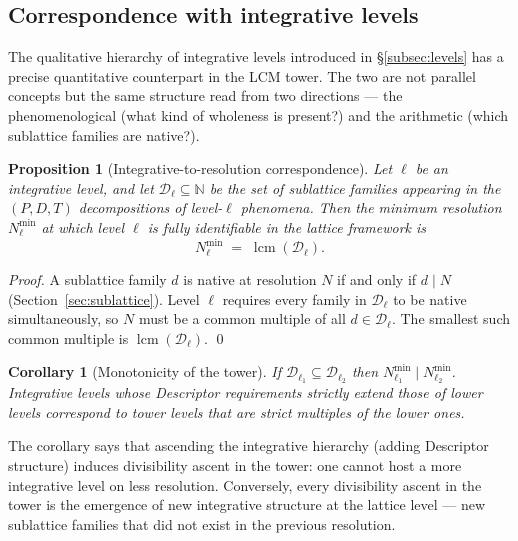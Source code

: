 \documentclass[11pt,a4paper]{article}
\newtheorem{corollary}[theorem]{Corollary}
\newtheorem{proposition}[theorem]{Proposition}
\theoremstyle{definition}
\theoremstyle{remark}
\newcommand{\N}{\mathbb{N}}
\DeclareMathOperator{\lcm}{lcm}
\begin{document}
\subsection{Correspondence with integrative levels}\label{subsec:levels-tower}

The qualitative hierarchy of integrative levels introduced in \S\ref{subsec:levels} has a precise quantitative counterpart in the LCM tower. The two are not parallel concepts but the same structure read from two directions --- the phenomenological (what kind of wholeness is present?) and the arithmetic (which sublattice families are native?).

\begin{proposition}[Integrative-to-resolution correspondence]\label{prop:int-resolution}
Let $\ell$ be an integrative level, and let $\mathcal{D}_{\ell}\subseteq\N$ be the set of sublattice families appearing in the $(P,D,T)$ decompositions of level-$\ell$ phenomena. Then the minimum resolution $N_{\ell}^{\min}$ at which level $\ell$ is fully identifiable in the lattice framework is
\[
\boxed{\;N_{\ell}^{\min} \;=\; \lcm(\mathcal{D}_{\ell}).\;}
\]
\end{proposition}

\begin{proof}
A sublattice family $d$ is native at resolution $N$ if and only if $d\mid N$ (Section~\ref{sec:sublattice}). Level $\ell$ requires every family in $\mathcal{D}_{\ell}$ to be native simultaneously, so $N$ must be a common multiple of all $d\in\mathcal{D}_{\ell}$. The smallest such common multiple is $\lcm(\mathcal{D}_{\ell})$. \qed
\end{proof}

\begin{corollary}[Monotonicity of the tower]\label{cor:int-monotone}
If $\mathcal{D}_{\ell_{1}}\subseteq\mathcal{D}_{\ell_{2}}$ then $N_{\ell_{1}}^{\min}\mid N_{\ell_{2}}^{\min}$. Integrative levels whose Descriptor requirements strictly extend those of lower levels correspond to tower levels that are strict multiples of the lower ones.
\end{corollary}

The corollary says that ascending the integrative hierarchy (adding Descriptor structure) induces divisibility ascent in the tower: one cannot host a more integrative level on less resolution. Conversely, every divisibility ascent in the tower is the emergence of new integrative structure at the lattice level --- new sublattice families that did not exist in the previous resolution.
\end{document}
